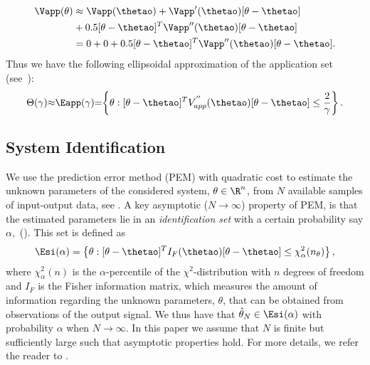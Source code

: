 \documentclass{ifacconf}
\begin{document}
\begin{equation} \label{Eq:ellipsoidalApprox}
\begin{split}
	\Vapp(\theta) &\approx
									 \Vapp(\thetao) + \Vapp'(\thetao) [\theta - \thetao]\\
						& +  0.5 [\theta - \thetao]^T\Vapp''(\thetao) [\theta - \thetao]\\
						&= 0 + 0 + 0.5 [\theta - \thetao]^T \Vapp''(\thetao) [\theta - \thetao].
\end{split}
\end{equation}
Thus we have the following ellipsoidal approximation of the application set (see~\cite{Hjalmarsson2009}):
\begin{equation}\label{Eq:ellipsoidalApproxApplicationSet}
	\Theta (\gamma) \hspace{-0.1cm} \approx  \hspace{-0.1cm} \Eapp(\gamma) \hspace{-0.1cm}=\hspace{-0.1cm}  \left\{\theta: [\theta - \thetao]^T V^{''}_{app}(\thetao) [\theta - \thetao]  \leq \frac{2}{\gamma} \right\}.
\end{equation}
\vspace{-0.3cm}
\subsection{System Identification}
We use the prediction error method (PEM) with quadratic cost to estimate the unknown parameters of the considered system, $\theta\in\R^n$, from $N$ available samples of input-output data, see \cite{L.Ljung1999}. A key asymptotic ($N\rightarrow \infty$) property of PEM, is that the estimated parameters lie in an \emph{identification set} with a certain probability say $\alpha,$ (\cite{Wahlberg&Ljung:92}). This set is defined as
\begin{equation}
	\label {id set}
	\Esi(\alpha)=\left\{
							\theta:[\theta-\thetao]^TI_F(\thetao)[\theta-\thetao]\leq  {\chi^2_\alpha(n_\theta)}
					 \right\},
\end{equation}
where $\chi^2_\alpha(n)$ is the $\alpha$-percentile of the $\chi^2$-distribution with $n$ degrees of freedom and $I_F$ is the Fisher information matrix, which measures the amount of information regarding the unknown parameters, $\theta$, that can be obtained from observations of the output signal. We thus have that $\hat{\theta}_N\in\Esi(\alpha)$ with probability $\alpha$ when $N\rightarrow \infty$. In this paper we assume that $N$ is finite but sufficiently large such that asymptotic properties hold. For more details, we refer the reader to \cite{L.Ljung1999}.
\end{document}
